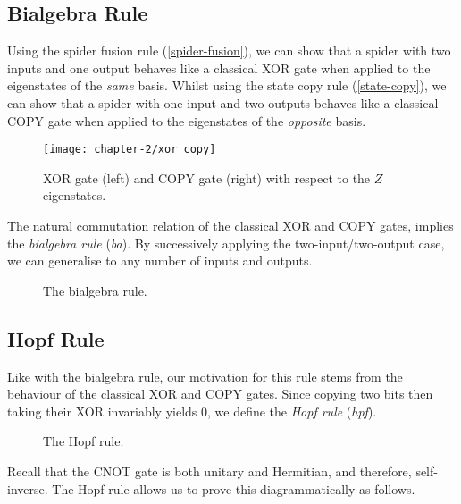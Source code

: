 
\subsection{Bialgebra Rule}

Using the spider fusion rule (\ref{spider-fusion}), we can show that a spider with two inputs and one output behaves like a classical XOR gate when applied to the eigenstates of the \textit{same} basis. Whilst using the state copy rule (\ref{state-copy}), we can show that a spider with one input and two outputs behaves like a classical COPY gate when applied to the eigenstates of the \textit{opposite} basis.

\begin{figure}[H]
    \centering
    \texttt{[image: chapter-2/xor\_copy]}
    \caption{XOR gate (left) and COPY gate (right) with respect to the $Z$ eigenstates.}
    \label{xor}
    \label{copy}
\end{figure}

The natural commutation relation of the classical XOR and COPY gates, implies the \textit{bialgebra rule} (\textit{ba}). By successively applying the two-input/two-output case, we can generalise to any number of inputs and outputs.


\begin{figure}[H]
    \centering
    \caption{The bialgebra rule.}
    \label{bialgebra}
\end{figure}



\subsection{Hopf Rule}

Like with the bialgebra rule, our motivation for this rule stems from the behaviour of the classical XOR and COPY gates. Since copying two bits then taking their XOR invariably yields 0, we define the \textit{Hopf rule} (\textit{hpf}).

\begin{figure}[H]
    \centering
    \caption{The Hopf rule.}
    \label{hopf}
\end{figure}

Recall that the CNOT gate is both unitary and Hermitian, and therefore, self-inverse. The Hopf rule allows us to prove this diagrammatically as follows.

